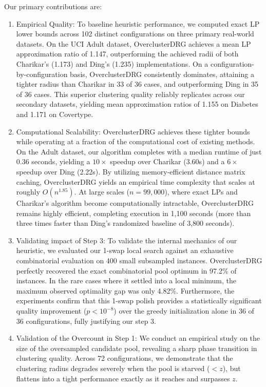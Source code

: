 \documentclass[twoside,leqno,twocolumn]{article}
\newcommand{\N}{n}
\begin{document}
Our primary contributions are:
\begin{enumerate}
    \item Empirical Quality: To baseline heuristic performance, we computed exact LP lower bounds across 102 distinct configurations on three primary real-world datasets. On the UCI Adult dataset, OverclusterDRG achieves a mean LP approximation ratio of 1.147, outperforming the achieved radii of both Charikar's (1.173) and Ding's (1.235) implementations. On a configuration-by-configuration basis, OverclusterDRG consistently dominates, attaining a tighter radius than Charikar in 33 of 36 cases, and outperforming Ding in 35 of 36 cases. This superior clustering quality reliably replicates across our secondary datasets, yielding mean approximation ratios of 1.155 on Diabetes and 1.171 on Covertype.

    \item Computational Scalability: OverclusterDRG achieves these tighter bounds while operating at a fraction of the computational cost of existing methods. On the Adult dataset, our algorithm completes with a median runtime of just 0.36 seconds, yielding a $10\times$ speedup over Charikar (3.60s) and a $6\times$ speedup over Ding (2.22s). By utilizing memory-efficient distance matrix caching, OverclusterDRG yields an empirical time complexity that scales at roughly $O(\N^{1.85})$. At large scales ($\N = 99,000$), where exact LPs and Charikar's algorithm become computationally intractable, OverclusterDRG remains highly efficient, completing execution in 1,100 seconds (more than three times faster than Ding's randomized baseline of 3,800 seconds).

    \item Validating impact of Step 3: To validate the internal mechanics of our heuristic, we evaluated our 1-swap local search against an exhaustive combinatorial evaluation on 400 small subsampled instances. OverclusterDRG perfectly recovered the exact combinatorial pool optimum in 97.2\% of instances. In the rare cases where it settled into a local minimum, the maximum observed optimality gap was only 4.82\%. Furthermore, the experiments confirm that this 1-swap polish provides a statistically significant quality improvement ($p < 10^{-8}$) over the greedy initialization alone in 36 of 36 configurations, fully justifying our step 3.

    \item Validation of the Overcount in Step 1: We conduct an empirical study on the size of the oversampled candidate pool, revealing a sharp phase transition in clustering quality. Across 72 configurations, we demonstrate that the clustering radius degrades severely when the pool is starved ($< z$), but flattens into a tight performance exactly as it reaches and surpasses $z$.
\end{enumerate}
\end{document}
